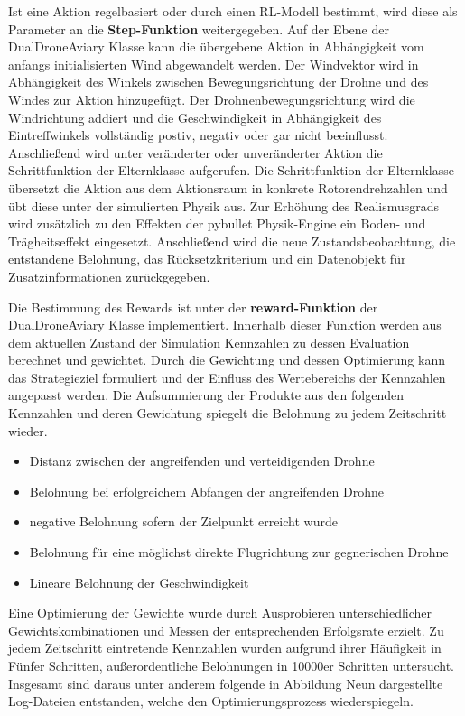Ist eine Aktion regelbasiert oder durch einen RL-Modell bestimmt, wird diese als Parameter an die \textbf{Step-Funktion} weitergegeben.
Auf der Ebene der DualDroneAviary Klasse kann die übergebene Aktion in Abhängigkeit vom anfangs initialisierten Wind abgewandelt werden.
Der Windvektor wird in Abhängigkeit des Winkels zwischen Bewegungsrichtung der Drohne und des Windes zur Aktion hinzugefügt.
Der Drohnenbewegungsrichtung wird die Windrichtung addiert und die Geschwindigkeit in Abhängigkeit des Eintreffwinkels vollständig postiv, negativ oder gar nicht beeinflusst.
Anschließend wird unter veränderter oder unveränderter Aktion die Schrittfunktion der Elternklasse aufgerufen.
Die Schrittfunktion der Elternklasse übersetzt die Aktion aus dem Aktionsraum in konkrete Rotorendrehzahlen und übt diese unter der simulierten Physik aus.
Zur Erhöhung des Realismusgrads wird zusätzlich zu den Effekten der pybullet Physik-Engine ein Boden- und Trägheitseffekt eingesetzt.
Anschließend wird die neue Zustandsbeobachtung, die entstandene Belohnung, das Rücksetzkriterium und ein Datenobjekt für Zusatzinformationen zurückgegeben.

Die Bestimmung des Rewards ist unter der \textbf{reward-Funktion} der DualDroneAviary Klasse implementiert.
Innerhalb dieser Funktion werden aus dem aktuellen Zustand der Simulation Kennzahlen zu dessen Evaluation berechnet und gewichtet.
Durch die Gewichtung und dessen Optimierung kann das Strategieziel formuliert und der Einfluss des Wertebereichs der Kennzahlen angepasst werden.
Die Aufsummierung der Produkte aus den folgenden Kennzahlen und deren Gewichtung spiegelt die Belohnung zu jedem Zeitschritt wieder.
\begin{itemize}
    \item Distanz zwischen der angreifenden und verteidigenden Drohne
    \item Belohnung bei erfolgreichem Abfangen der angreifenden Drohne
    \item negative Belohnung sofern der Zielpunkt erreicht wurde
    \item Belohnung für eine möglichst direkte Flugrichtung zur gegnerischen Drohne
    \item Lineare Belohnung der Geschwindigkeit
\end{itemize}
Eine Optimierung der Gewichte wurde durch Ausprobieren unterschiedlicher Gewichtskombinationen und Messen der entsprechenden Erfolgsrate erzielt.
Zu jedem Zeitschritt eintretende Kennzahlen wurden aufgrund ihrer Häufigkeit in Fünfer Schritten, außerordentliche Belohnungen in 10000er Schritten untersucht.
Insgesamt sind daraus unter anderem folgende in Abbildung Neun dargestellte Log-Dateien entstanden, welche den Optimierungsprozess wiederspiegeln.

